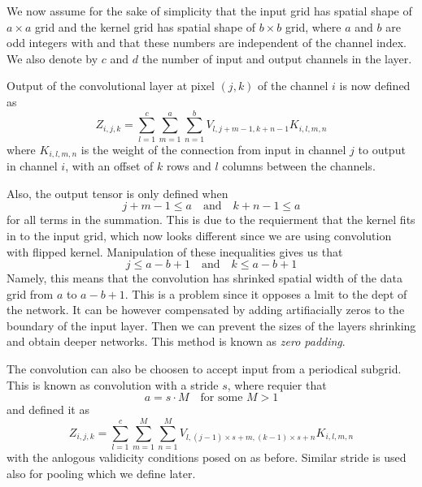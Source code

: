 \documentclass[]{article}
\begin{document}
We now assume for the sake of simplicity that the input grid has spatial shape of
$a \times a$ grid and the kernel grid has spatial shape of $b \times b$ grid, where
$a$ and $b$ are odd integers with
and that these numbers are independent of the channel index. We also denote by $c$
and $d$ the number of input and output channels in the layer.


Output of the convolutional layer at pixel $(j, k)$ of the channel $i$ is now
defined as
\[
Z_{i, j, k} = \sum_{l=1}^c \sum_{m = 1}^a \sum_{n=1}^b
V_{l, j + m -1, k + n -1} K_{i, l, m, n}
\]
where $K_{i, l, m, n}$ is the weight of the connection from input in channel $j$
to output in channel $i$, with an offset of $k$ rows and $l$ columns between the
channels.


Also, the output tensor is only defined when
\[
j + m - 1 \le a \quad \text{and} \quad k + n - 1 \le a
\]
for all terms in the summation. This is due to the requierment that the kernel fits
in to the input grid, which now looks different since we are using convolution
with flipped kernel. Manipulation of these inequalities gives us that
\[
 j \le a - b + 1\quad \text{and} \quad  k \le a - b + 1
\]
Namely, this means that the convolution has shrinked spatial width of the data grid
from $a$ to $a - b + 1$. This is a problem since it opposes a lmit to the dept of
the network. It can be however compensated by adding artifiacially zeros to the
boundary of the input layer. Then we can prevent the sizes of the layers shrinking
and obtain deeper networks. This method is known as \emph{zero padding}.

The convolution can also be choosen to accept input from a periodical subgrid.
This is known as convolution with a stride $s$, where requier that
\[
a = s \cdot M \quad \text{for some $M > 1$}
\]
and defined it as
\[
Z_{i, j, k} = \sum_{l=1}^c \sum_{m = 1}^M \sum_{n=1}^M
V_{l, (j -1)\times s + m, (k-1)\times s + n} K_{i, l, m, n}
\]
with the anlogous validicity conditions posed on as before. Similar stride is used
also for pooling which we define later.
\end{document}
